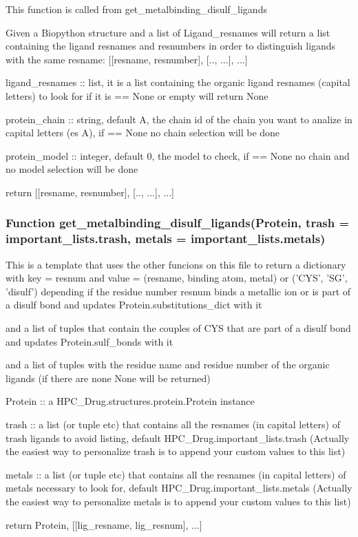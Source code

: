         This function is called from get\_metalbinding\_disulf\_ligands

        Given a Biopython structure and a list of Ligand\_resnames will return 
        a list containing the ligand resnames and resnumbers
        in order to distinguish ligands with the same resname: [[resname, resnumber], [.., ...], ...]
        
        ligand\_resnames :: list, it is a list containing the organic ligand resnames (capital letters) to look for
        if it is == None or empty will return None

        protein\_chain :: string, default A, the chain id of the chain you want to analize in capital letters (es A), if == None no chain selection will be done
        
        protein\_model :: integer, default 0, the model to check, if == None no chain and no model selection will be done

        return [[resname, resnumber], [.., ...], ...]

    \subsubsection{Function get\_metalbinding\_disulf\_ligands(Protein, trash = important\_lists.trash, metals = important\_lists.metals)}
    
        This is a template that uses the other funcions on this file to return a dictionary with key = resnum and value = (resname, binding atom, metal) or ('CYS', 'SG', 'disulf') depending if the residue number {resnum} binds a metallic ion or is part of a disulf bond and updates Protein.substitutions\_dict with it

        and a list of tuples that contain the couples of CYS that are part of a disulf bond and updates Protein.sulf\_bonds with it

        and a list of tuples with the residue name and residue number of the organic ligands (if there are none None will be returned)

        Protein :: a HPC\_Drug.structures.protein.Protein instance

        trash :: a list (or tuple etc) that contains all the resnames (in capital letters) of trash ligands to avoid listing, default HPC\_Drug.important\_lists.trash (Actually the easiest way to personalize trash is to append your custom values to this list)

        metals :: a list (or tuple etc) that contains all the resnames (in capital letters) of metals necessary to look for, default HPC\_Drug.important\_lists.metals (Actually the easiest way to personalize metals is to append your custom values to this list)

        return Protein, [[lig\_resname, lig\_resnum], ...]